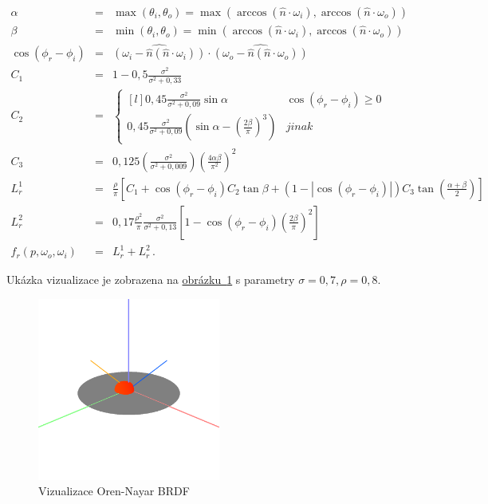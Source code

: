 \documentclass[czech,master]{diploma}
\newcommand{\uvec}[1]{\hat{#1}}
\newcommand{\point}{p}
\newcommand{\brdf}{f_r\left(\point,\omega_{o},\omega_{i}\right)}
\newcommand{\normVec}{\uvec{n}}
\newcommand{\inVec}{\omega_{i}}
\newcommand{\outVec}{\omega_{o}}
\newcommand{\alb}{\rho}
\newcommand{\rough}{\sigma}
\begin{document}
\newcommand{\cosphiri}{\cos\left(\phi_r-\phi_i\right)}

\begin{eqnarray}
  \alpha & = & \max(\theta_i , \theta_o) = \max(\arccos(\normVec\cdot\inVec), \arccos(\normVec\cdot\outVec)) \nonumber \\
  \beta & = & \min(\theta_i , \theta_o) = \min(\arccos(\normVec\cdot\inVec), \arccos(\normVec\cdot\outVec)) \nonumber \\
  \cosphiri & = & \widehat{\left( \inVec - \normVec(\normVec\cdot\inVec) \right)} \cdot \widehat{\left( \outVec - \normVec(\normVec\cdot\outVec)  \right)} \nonumber \\
  C_1 & = & 1-0{,}5\frac{\rough^{2}}{\rough^{2} + 0{,}33} \nonumber \\
  C_2 & = & \left\{\begin{matrix*}[l] 0{,}45\frac{\rough^{2}}{\rough^{2}+0{,}09}\sin\alpha & \cosphiri \geq 0\\ 0{,}45\frac{\rough^{2}}{\rough^2+0{,}09}\left(\sin\alpha-\left(\frac{2\beta}{\pi}\right)^{3}\right) & jinak \end{matrix*}\right. \nonumber \\
  C_3 & = & 0{,}125\left(\frac{\rough^2}{\rough^2 + 0{,}009}\right)\left(\frac{4\alpha\beta}{\pi^2}\right)^{2} \nonumber \\
  L^{1}_{r} & = & \frac{\alb}{\pi}\left[C_1 + \cosphiri C_2\tan\beta + \left( 1-\left | \cosphiri  \right | \right)C_3\tan \left(\frac{\alpha+\beta}{2}\right)\right] \nonumber \\
  L^{2}_{r} & = & 0{,}17\frac{\alb^{2}}{\pi}\frac{\rough^{2}}{\rough^2+0{,}13}\left[1 - \cosphiri  \left(\frac{2\beta}{\pi}\right)^{2} \right] \nonumber \\
  \brdf & = & L^{1}_{r} + L^{2}_{r}\,. \label{eq:OrenNayar}
\end{eqnarray}

Ukázka vizualizace je zobrazena na \hyperref[fig:orenNayarBRDFRender]{obrázku~\ref{fig:orenNayarBRDFRender}} s parametry \(\rough=0{,}7, \alb = 0{,}8\).

\begin{figure}[ht]%
  \centering\includegraphics[width=6cm]{Figures/visualizations/brdfOrenNayar.png}%
  \caption{Vizualizace Oren-Nayar BRDF}%
  \label{fig:orenNayarBRDFRender}%
\end{figure}
\end{document}
